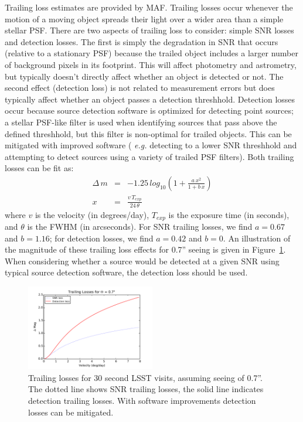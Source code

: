 \documentclass{iau}
\begin{document}
Trailing loss estimates are provided by MAF. Trailing losses occur
whenever the motion of a moving object spreads their light over a
wider area than a simple stellar PSF. There are two aspects
of trailing loss to consider: simple SNR losses and detection losses.
The first is simply the degradation in SNR that occurs (relative to a
stationary PSF) because the trailed object includes a larger number of
background pixels in its footprint. This will affect photometry and
astrometry, but typically doesn't directly affect whether an object is
detected or not. The second effect (detection loss) is not related to
measurement errors but does typically affect whether an object passes
a detection threshhold. Detection losses occur because source
detection software is optimized for detecting point sources;
a stellar PSF-like filter is used when identifying sources that pass
above the defined threshhold, but this filter is non-optimal for
trailed objects. This can be mitigated with improved software ({\it
e.g.} detecting to a lower SNR threshhold and attempting to detect
sources using a variety of trailed PSF filters). Both trailing losses can
be fit as:
\begin{eqnarray}
\Delta \, m & = &-1.25 \, log_{10} \left( 1 + \frac{a \, x^2} { 1 + b\,
    x} \right) \\
x & = & \frac{v \, T_{exp}} {24 \, \theta} 
\end{eqnarray}
where $v$ is the velocity (in degrees/day), $T_{exp}$ is the exposure
time (in seconds), and $\theta$ is the FWHM (in arcseconds). For
SNR trailing losses, we find $a = 0.67$ and $b = 1.16$; for
detection losses, we find $a=0.42$ and $b=0$. An illustration of the
magnitude of these trailing loss effects for 0.7'' seeing is given in
Figure~\ref{trailinglosses}. When considering whether a source would
be detected at a given SNR using typical source detection software,
the detection loss should be used.

\begin{figure}
\centering
\includegraphics[width=0.5\textwidth]{trailing_losses}
\caption{Trailing losses for 30 second LSST visits, assuming seeing of
  0.7''. The dotted line shows SNR trailing losses, the solid line
  indicates  detection trailing losses. With software improvements
  detection losses can be mitigated.
\label{trailinglosses}}
\end{figure}
\end{document}
